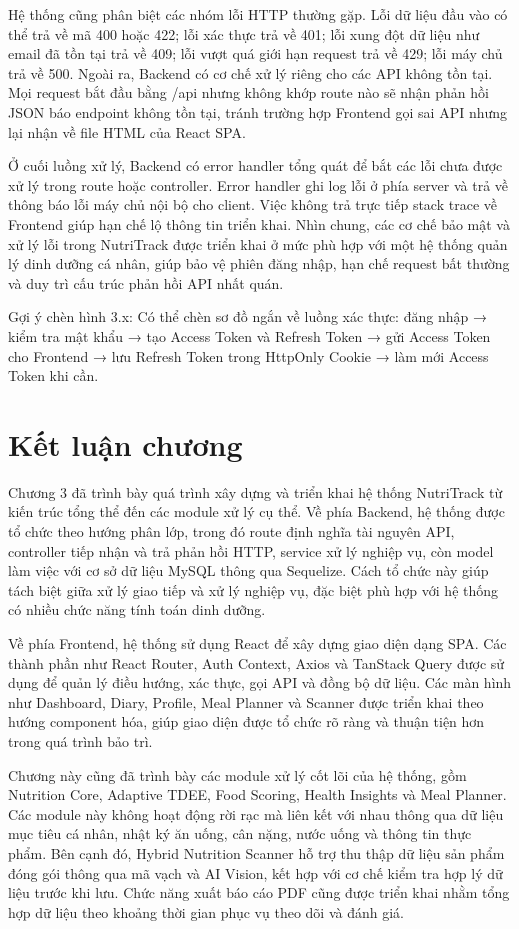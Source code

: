 \documentclass[12pt, a4paper]{report}
\begin{document}
Hệ thống cũng phân biệt các nhóm lỗi HTTP thường gặp. Lỗi dữ liệu đầu vào có thể trả về mã 400 hoặc 422; lỗi xác thực trả về 401; lỗi xung đột dữ liệu như email đã tồn tại trả về 409; lỗi vượt quá giới hạn request trả về 429; lỗi máy chủ trả về 500. Ngoài ra, Backend có cơ chế xử lý riêng cho các API không tồn tại. Mọi request bắt đầu bằng /api nhưng không khớp route nào sẽ nhận phản hồi JSON báo endpoint không tồn tại, tránh trường hợp Frontend gọi sai API nhưng lại nhận về file HTML của React SPA.

Ở cuối luồng xử lý, Backend có error handler tổng quát để bắt các lỗi chưa được xử lý trong route hoặc controller. Error handler ghi log lỗi ở phía server và trả về thông báo lỗi máy chủ nội bộ cho client. Việc không trả trực tiếp stack trace về Frontend giúp hạn chế lộ thông tin triển khai. Nhìn chung, các cơ chế bảo mật và xử lý lỗi trong NutriTrack được triển khai ở mức phù hợp với một hệ thống quản lý dinh dưỡng cá nhân, giúp bảo vệ phiên đăng nhập, hạn chế request bất thường và duy trì cấu trúc phản hồi API nhất quán.

Gợi ý chèn hình 3.x: Có thể chèn sơ đồ ngắn về luồng xác thực: đăng nhập → kiểm tra mật khẩu → tạo Access Token và Refresh Token → gửi Access Token cho Frontend → lưu Refresh Token trong HttpOnly Cookie → làm mới Access Token khi cần.

\section{Kết luận chương}Chương 3 đã trình bày quá trình xây dựng và triển khai hệ thống NutriTrack từ kiến trúc tổng thể đến các module xử lý cụ thể. Về phía Backend, hệ thống được tổ chức theo hướng phân lớp, trong đó route định nghĩa tài nguyên API, controller tiếp nhận và trả phản hồi HTTP, service xử lý nghiệp vụ, còn model làm việc với cơ sở dữ liệu MySQL thông qua Sequelize. Cách tổ chức này giúp tách biệt giữa xử lý giao tiếp và xử lý nghiệp vụ, đặc biệt phù hợp với hệ thống có nhiều chức năng tính toán dinh dưỡng.

Về phía Frontend, hệ thống sử dụng React để xây dựng giao diện dạng SPA. Các thành phần như React Router, Auth Context, Axios và TanStack Query được sử dụng để quản lý điều hướng, xác thực, gọi API và đồng bộ dữ liệu. Các màn hình như Dashboard, Diary, Profile, Meal Planner và Scanner được triển khai theo hướng component hóa, giúp giao diện được tổ chức rõ ràng và thuận tiện hơn trong quá trình bảo trì.

Chương này cũng đã trình bày các module xử lý cốt lõi của hệ thống, gồm Nutrition Core, Adaptive TDEE, Food Scoring, Health Insights và Meal Planner. Các module này không hoạt động rời rạc mà liên kết với nhau thông qua dữ liệu mục tiêu cá nhân, nhật ký ăn uống, cân nặng, nước uống và thông tin thực phẩm. Bên cạnh đó, Hybrid Nutrition Scanner hỗ trợ thu thập dữ liệu sản phẩm đóng gói thông qua mã vạch và AI Vision, kết hợp với cơ chế kiểm tra hợp lý dữ liệu trước khi lưu. Chức năng xuất báo cáo PDF cũng được triển khai nhằm tổng hợp dữ liệu theo khoảng thời gian phục vụ theo dõi và đánh giá.
\end{document}
